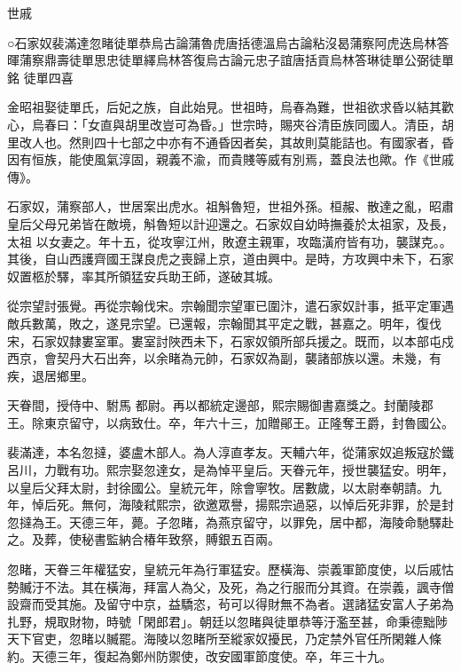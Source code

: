 
\begin{pinyinscope}

 世戚



 ○石家奴裴滿達忽睹徒單恭烏古論蒲魯虎唐括德溫烏古論粘沒曷蒲察阿虎迭烏林答暉蒲察鼎壽徒單思忠徒單繹烏林答復烏古論元忠子誼唐括貢烏林答琳徒單公弼徒單銘
 徒單四喜



 金昭祖娶徒單氏，后妃之族，自此始見。世祖時，烏春為難，世祖欲求昏以結其歡心，烏春曰：「女直與胡里改豈可為昏。」世宗時，賜夾谷清臣族同國人。清臣，胡里改人也。然則四十七部之中亦有不通昏因者矣，其故則莫能詰也。有國家者，昏因有恒族，能使風氣淳固，親義不渝，而貴賤等威有別焉，蓋良法也歟。作《世戚傳》。



 石家奴，蒲察部人，世居案出虎水。祖斛魯短，世祖外孫。桓赧、散達之亂，昭肅皇后父母兄弟皆在敵境，斛魯短以計迎還之。石家奴自幼時撫養於太祖家，及長，太祖
 以女妻之。年十五，從攻寧江州，敗遼主親軍，攻臨潢府皆有功，襲謀克。。其後，自山西護齊國王謀良虎之喪歸上京，道由興中。是時，方攻興中未下，石家奴置柩於驛，率其所領猛安兵助王師，遂破其城。



 從宗望討張覺。再從宗翰伐宋。宗翰聞宗望軍已圍汴，遣石家奴計事，抵平定軍遇敵兵數萬，敗之，遂見宗望。已還報，宗翰聞其平定之戰，甚嘉之。明年，復伐宋，石家奴隸婁室軍。婁室討陜西未下，石家奴領所部兵援之。既而，以本部屯戍西京，會契丹大石出奔，以余睹為元帥，石家奴為副，襲諸部族以還。未幾，有疾，退居鄉里。



 天眷間，授侍中、駙馬
 都尉。再以都統定邊部，熙宗賜御書嘉獎之。封蘭陵郡王。除東京留守，以病致仕。卒，年六十三，加贈鄖王。正隆奪王爵，封魯國公。



 裴滿達，本名忽撻，婆盧木部人。為人淳直孝友。天輔六年，從蒲家奴追叛寇於鐵呂川，力戰有功。熙宗娶忽達女，是為悼平皇后。天眷元年，授世襲猛安。明年，以皇后父拜太尉，封徐國公。皇統元年，除會寧牧。居數歲，以太尉奉朝請。九年，悼后死。無何，海陵弒熙宗，欲邀眾譽，揚熙宗過惡，以悼后死非罪，於是封忽撻為王。天德三年，薨。子忽睹，為燕京留守，以罪免，居中都，海陵命馳驛赴
 之。及葬，使秘書監納合椿年致祭，賻銀五百兩。



 忽睹，天眷三年權猛安，皇統元年為行軍猛安。歷橫海、崇義軍節度使，以后戚怙勢贓汙不法。其在橫海，拜富人為父，及死，為之行服而分其資。在崇義，諷寺僧設齋而受其施。及留守中京，益驕恣，茍可以得財無不為者。選諸猛安富人子弟為扎野，規取財物，時號「閑郎君」。朝廷以忽睹與徒單恭等汙濫至甚，命秉德黜陟天下官吏，忽睹以贓罷。海陵以忽睹所至縱家奴擾民，乃定禁外官任所閑雜人條約。天德三年，復起為鄭州防禦使，改安國軍節度使。卒，年三十九。




\end{pinyinscope}
